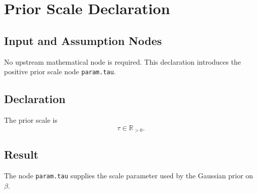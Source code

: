 \section{Prior Scale Declaration}
\label{def:tau}

\subsection{Input and Assumption Nodes}
No upstream mathematical node is required. This declaration introduces the positive prior scale node \texttt{param.tau}.

\subsection{Declaration}
The prior scale is
\[
  \tau \in \mathbb{R}_{>0}.
\]

\subsection{Result}
The node \texttt{param.tau} supplies the scale parameter used by the Gaussian prior on \(\beta\).
